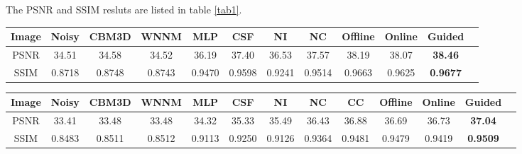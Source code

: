 \documentclass[10pt,twocolumn,letterpaper]{article}
\begin{document}
The PSNR and SSIM resluts are listed in table \ref{tab1}.
\begin{table*}\label{tab1}
\caption{Average PSNR(dB) results of different methods on 60 cropped real noisy images captured in \cite{crosschannel2016}.}
\label{tab1}
\begin{center}
\renewcommand\arraystretch{1}
\begin{tabular}{|c||c|c|c|c|c|c|c|c|c|c|c|}
\hline
Image & \textbf{Noisy} &\textbf{CBM3D}&\textbf{WNNM}&\textbf{MLP}&\textbf{CSF}& \textbf{NI}& \textbf{NC}&\textbf{Offline} &\textbf{Online} &\textbf{Guided} 
\\
\hline
PSNR & 34.51  &  34.58 &  34.52  & 36.19   & 37.40 &  36.53  &  37.57  &  38.19   & 38.07 &  \textbf{ 38.46}
\\
\hline
SSIM & 0.8718  & 0.8748  & 0.8743   & 0.9470 & 0.9598  & 0.9241  &  0.9514  &  0.9663   & 0.9625 &   \textbf{0.9677}
\\
\hline
\end{tabular}
\end{center}
\end{table*}

\begin{table*}\label{tab2}
\caption{Average PSNR(dB) results of different methods on 15 cropped real noisy images used in \cite{crosschannel2016}.}
\label{tab1}
\begin{center}
\renewcommand\arraystretch{1}
\begin{tabular}{|c||c|c|c|c|c|c|c|c|c|c|c|c|}
\hline
Image & \textbf{Noisy} &\textbf{CBM3D}&\textbf{WNNM}&\textbf{MLP}&\textbf{CSF}& \textbf{NI}& \textbf{NC}& \textbf{CC}&\textbf{Offline} &\textbf{Online} &\textbf{Guided} 
\\
\hline
PSNR & 33.41  &  33.48 &  33.48  & 34.32   & 35.33 &  35.49   &  36.43  &  36.88  & 36.69 & 36.73 &  \textbf{ 37.04}
\\
\hline
SSIM & 0.8483  & 0.8511  & 0.8512   & 0.9113 & 0.9250  & 0.9126  &  0.9364  & 0.9481  & 0.9479 & 0.9419 &  \textbf{ 0.9509}
\\
\hline
\end{tabular}
\end{center}
\end{table*}
\end{document}

